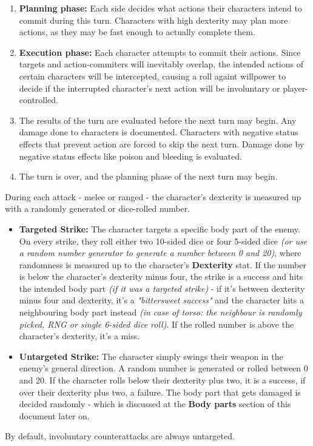 \begin{enumerate}
  \item \textbf{Planning phase:} Each side decides what actions their characters intend to commit during this turn. Characters with high dexterity may plan more actions, as they may be fast enough to actually complete them.
  \item \textbf{Execution phase:} Each character attempts to commit their actions. Since targets and action-commiters will inevitably overlap, the intended actions of certain characters will be intercepted, causing a roll againt willpower to decide if the interrupted character's next action will be involuntary or player-controlled.
  \item The results of the turn are evaluated before the next turn may begin. Any damage done to characters is documented. Characters with negative status effects that prevent action are forced to skip the next turn. Damage done by negative status effects like poison and bleeding is evaluated.
  \item The turn is over, and the planning phase of the next turn may begin.
\end{enumerate}
During each attack - melee or ranged - the character's dexterity is measured up with a randomly generated or dice-rolled number.
\begin{itemize}
\item \textbf{Targeted Strike:} The character targets a specific body part of the enemy. On every strike, they roll either two 10-sided dice or four 5-sided dice \textit{(or use a random number generator to generate a number between 0 and 20)}, where randomness is measured up to the character's \textbf{Dexterity} stat. If the number is below the character's dexterity minus four, the strike is a success and hits the intended body part \textit{(if it was a targeted strike)} - if it's between dexterity minus four and dexterity, it's a \textit{"bittersweet success"} and the character hits a neighbouring body part instead \textit{(in case of torso: the neighbour is randomly picked, RNG or single 6-sided dice roll)}. If the rolled number is above the character's dexterity, it's a miss.
\item \textbf{Untargeted Strike:} The character simply swings their weapon in the enemy's general direction. A random number is generated or rolled between 0 and 20. If the character rolls below their dexterity plus two, it is a success, if over their dexterity plus two, a failure. The body part that gets damaged is decided randomly - which is discussed at the \textbf{Body parts} section of this document later on.
\end{itemize}
By default, involuntary counterattacks are always untargeted.
